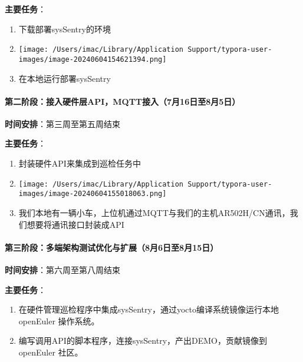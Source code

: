\documentclass[
]{article}
\begin{document}
\textbf{主要任务}：

\begin{enumerate}
\def\labelenumi{\arabic{enumi}.}
\item
  下载部署sysSentry的环境
\item
  \texttt{[image: /Users/imac/Library/Application Support/typora-user-images/image-20240604154621394.png]}
\item
  在本地运行部署sysSentry
\end{enumerate}

\paragraph{第二阶段：接入硬件层API，MQTT接入（7月16日至8月5日）}\label{ux7b2cux4e8cux9636ux6bb5ux63a5ux5165ux786cux4ef6ux5c42apimqttux63a5ux51657ux670816ux65e5ux81f38ux67085ux65e5uxff09}

\textbf{时间安排}：第三周至第五周结束

\textbf{主要任务}：

\begin{enumerate}
\def\labelenumi{\arabic{enumi}.}
\item
  封装硬件API来集成到巡检任务中
\item
  \texttt{[image: /Users/imac/Library/Application Support/typora-user-images/image-20240604155018063.png]}
\item
  我们本地有一辆小车，上位机通过MQTT与我们的主机AR502H/CN通讯，我们想要将通讯接口封装成API
\end{enumerate}

\paragraph{第三阶段：多端架构测试优化与扩展（8月6日至8月15日）}\label{ux7b2cux4e09ux9636ux6bb5ux591aux7aefux67b6ux6784ux6d4bux8bd5ux4f18ux5316ux4e0eux6269ux5c558ux67086ux65e5ux81f38ux670815ux65e5uxff09}

\textbf{时间安排}：第六周至第八周结束

\textbf{主要任务}：

\begin{enumerate}
\def\labelenumi{\arabic{enumi}.}
\item
  在硬件管理巡检程序中集成sysSentry，通过yocto编译系统镜像运行本地openEuler
  操作系统。
\item
  编写调用API的脚本程序，连接sysSentry，产出DEMO，贡献镜像到openEuler
  社区。
\end{enumerate}
\end{document}
